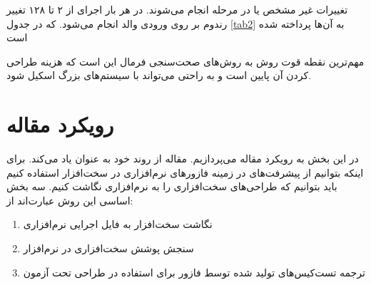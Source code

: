 \documentclass[conference]{IEEEtran}
\begin{document}
تغییرات غیر مشخص یا
در مرحله
انجام می‌شوند.
در هر بار اجرای
از ۲ تا ۱۲۸ تغییر رندوم بر روی ورودی والد انجام می‌شود.
که در جدول
\ref{tab2}
به آن‌ها پرداخته شده است
\begin{table}[htbp]
    \caption{Non-Deterministic havoc Mutations}
    \begin{center}
    \label{tab2}
    \end{center}
\end{table}
مهم‌ترین نقطه قوت روش
به روش‌های صحت‌سنجی فرمال این است که هزینه طراحی کردن آن پایین است و به راحتی می‌تواند
با سیستم‌های بزرگ اسکیل شود.
\section{
    رویکرد
    مقاله
}
در این بخش به رویکرد مقاله
\cite{hf}
می‌پردازیم.
مقاله
\cite{hf}
از روند خود به عنوان
یاد می‌کند.
برای اینکه بتوانیم از پیشرفت‌های در زمینه فازور‌های نرم‌افزاری در سخت‌افزار استفاده کنیم باید بتوانیم
که طراحی‌های سخت‌افزاری را به نرم‌افزاری نگاشت کنیم.
سه بخش اساسی این روش عبارت‌اند از:
\begin{enumerate}
    \item نگاشت سخت‌افزار به فایل اجرایی نرم‌افزاری
    \item سنجش پوشش سخت‌افزاری در نرم‌افزار
    \item ترجمه تست‌کیس‌های تولید شده توسط فازور برای استفاده در طراحی تحت آزمون
\end{enumerate}
\end{document}

